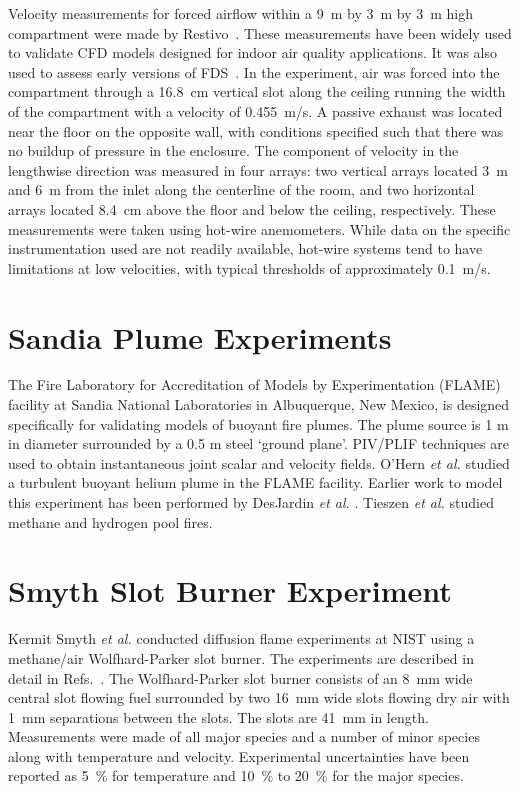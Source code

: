 Velocity measurements for forced airflow within a 9~m by 3~m by 3~m high compartment were made by Restivo~\cite{Restivo:1979}. These measurements
have been widely used to validate CFD models designed for indoor air quality applications. It was also used to assess early versions of
FDS~\cite{Emmerich:1,Emmerich:2,Musser:1}. In the experiment, air was forced into the compartment through a 16.8~cm vertical slot along the ceiling
running the width of the compartment with a velocity of 0.455~m/s. A passive exhaust was located near the floor on the opposite wall, with
conditions specified such that there was no buildup of pressure in the enclosure. The component
of velocity in the lengthwise direction was measured in four arrays: two vertical arrays located 3~m and 6~m  from the inlet along the
centerline of the room, and two horizontal arrays located 8.4~cm above the floor and below the ceiling, respectively.
These measurements were taken using hot-wire anemometers. While data on the specific
instrumentation used are not readily available, hot-wire systems tend to have limitations at low velocities,
with typical thresholds of approximately 0.1~m/s.


\section{Sandia Plume Experiments}

The Fire Laboratory for Accreditation of Models by Experimentation (FLAME) facility \cite{OHern:2005,Blanchat:2001} at Sandia National Laboratories in Albuquerque, New Mexico, is designed specifically for validating models of buoyant fire plumes.  The plume source is 1 m in diameter surrounded by a 0.5 m steel `ground plane'. PIV/PLIF techniques are used to obtain instantaneous joint scalar and velocity fields.  O'Hern {\em et al.} \cite{OHern:2005} studied a turbulent buoyant helium plume in the FLAME facility. Earlier work to model this experiment has been performed by DesJardin {\em et al.} \cite{DesJardin:2004}. Tieszen {\em et al.} \cite{Tieszen:2004,Tieszen:2002} studied methane and hydrogen pool fires.


\section{Smyth Slot Burner Experiment}

Kermit Smyth {\em et al.} conducted diffusion flame experiments at NIST using a methane/air Wolfhard-Parker slot burner.  The experiments are described in
detail in Refs.~\cite{Norton:1,Smyth:1}.  The Wolfhard-Parker slot burner consists of an 8~mm wide
central slot flowing fuel surrounded by two 16~mm wide slots flowing dry air with 1~mm separations between the slots.
The slots are 41~mm in length.  Measurements were made of all major species and a number of minor species along with temperature
and velocity.  Experimental uncertainties have been reported as 5~\% for temperature  and 10~\% to 20~\%
for the major species.


